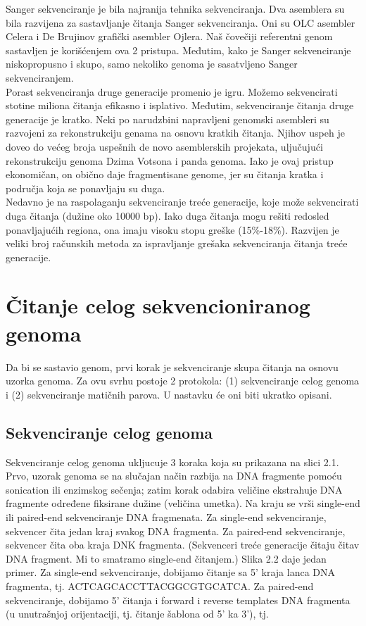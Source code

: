 \documentclass{article}
\begin{document}
Sanger sekvenciranje je bila najranija tehnika sekvenciranja. Dva asemblera su bila razvijena za sastavljanje čitanja Sanger sekvenciranja. Oni su OLC asembler Celera i De Brujinov grafički asembler Ojlera. Naš čovečiji referentni genom sastavljen je korišćenjem ova 2 pristupa. Međutim, kako je Sanger sekvenciranje niskopropusno i skupo, samo nekoliko genoma je sasatvljeno Sanger sekvenciranjem.\\

Porast sekvenciranja druge generacije promenio je igru. Možemo sekvencirati stotine miliona čitanja efikasno i isplativo. Međutim, sekvenciranje čitanja druge generacije je kratko. Neki po narudzbini napravljeni genomski asembleri su razvojeni za rekonstrukciju genama na osnovu kratkih čitanja. Njihov uspeh  je doveo do većeg broja uspešnih de novo asemblerskih projekata, uljučujući rekonstrukciju genoma Dzima Votsona i panda genoma. Iako je ovaj pristup ekonomičan, on obično daje fragmentisane genome, jer su čitanja kratka i područja koja se ponavljaju su duga.\\

Nedavno je na raspolaganju sekvenciranje treće generacije, koje može sekvencirati duga čitanja (dužine oko 10000 bp). Iako duga čitanja mogu rešiti redosled ponavljajućih regiona, ona imaju visoku stopu greške (15\%-18\%). Razvijen je veliki broj računskih metoda za ispravljanje grešaka sekvenciranja čitanja treće generacije.\\

\section{Čitanje celog sekvencioniranog genoma}

Da bi se sastavio genom, prvi korak je sekvenciranje skupa čitanja na osnovu uzorka genoma. Za ovu svrhu postoje 2 protokola: (1) sekvenciranje celog genoma i (2) sekvenciranje matičnih parova. U nastavku će oni biti ukratko opisani.

\subsection{Sekvenciranje celog genoma}

Sekvenciranje celog genoma ukljucuje 3 koraka koja su prikazana na slici 2.1.\\

Prvo, uzorak genoma se na slučajan način razbija na DNA fragmente pomoću sonication ili enzimskog sečenja; zatim korak odabira veličine ekstrahuje DNA fragmente određene fiksirane dužine (veličina umetka). Na kraju se vrši single-end ili paired-end sekvenciranje DNA fragmenata. Za single-end sekvenciranje, sekvencer čita jedan kraj svakog DNA fragmenta. Za paired-end sekvenciranje, sekvencer čita oba kraja DNK fragmenta. (Sekvenceri treće generacije čitaju čitav DNA fragment. Mi to smatramo single-end čitanjem.) Slika 2.2 daje jedan primer. Za single-end sekvenciranje, dobijamo čitanje sa 5' kraja lanca DNA fragmenta, tj. ACTCAGCACCTTACGGCGTGCATCA. Za paired-end sekvenciranje, dobijamo 5' čitanja i forward i reverse templates DNA fragmenta (u unutrašnjoj orijentaciji, tj. čitanje šablona od 5' ka 3'), tj.
\end{document}
